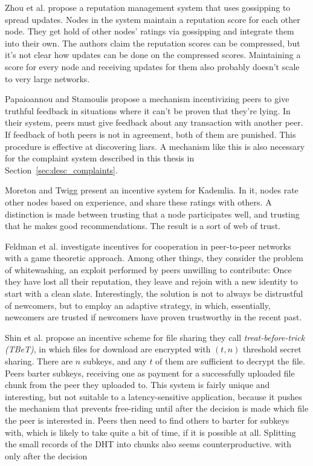 Zhou et al.\cite{zhou2007gossip} propose a reputation management system that
uses gossipping to spread updates. Nodes in the system maintain a reputation
score for each other node. They get hold of other nodes' ratings via gossipping
and integrate them into their own. The authors claim the reputation scores can
be compressed, but it's not clear how updates can be done on the compressed
scores. Maintaining a score for every node and receiving updates for them also
probably doesn't scale to very large networks.

Papaioannou and Stamoulis\cite{papaioannou2005optimizing} propose a mechanism
incentivizing peers to give truthful feedback in situations where it can't be
proven that they're lying. In their system, peers must give feedback about any
transaction with another peer. If feedback of both peers is not in agreement,
both of them are punished. This procedure is effective at discovering liars.  A
mechanism like this is also necessary for the complaint system described in this
thesis in Section~\ref{sec:desc_complaints}.

Moreton and Twigg\cite{moreton2003enforcing} present an incentive system for
Kademlia. In it, nodes rate other nodes based on experience, and share these
ratings with others. A distinction is made between trusting that a node
participates well, and trusting that he makes good recommendations. The result
is a sort of web of trust.

Feldman et al.\cite{feldman2004robust} investigate incentives for cooperation
in peer-to-peer networks with a game theoretic approach. Among other things,
they consider the problem of whitewashing, an exploit performed by peers
unwilling to contribute: Once they have lost all their reputation, they leave
and rejoin with a new identity to start with a clean slate. Interestingly, the
solution is not to always be distrustful of newcomers, but to employ an adaptive
strategy, in which, essentially, newcomers are trusted if newcomers have proven
trustworthy in the recent past.

Shin et al. propose an incentive scheme for file sharing they call
\emph{treat-before-trick (TBeT)}\cite{shin2009treat}, in which files for
download are encrypted with $(t, n)$ threshold secret sharing. There are $n$
subkeys, and any $t$ of them are sufficient to decrypt the file. Peers barter
subkeys, receiving one as payment for a successfully uploaded file chunk from
the peer they uploaded to. This system is fairly unique and interesting, but not
suitable to a latency-sensitive application, because it pushes the mechanism
that prevents free-riding until after the decision is made which file the peer
is interested in. Peers then need to find others to barter for subkeys with,
which is likely to take quite a bit of time, if it is possible at all. Splitting
the small records of the DHT into chunks also seems counterproductive.  with
only after the decision

